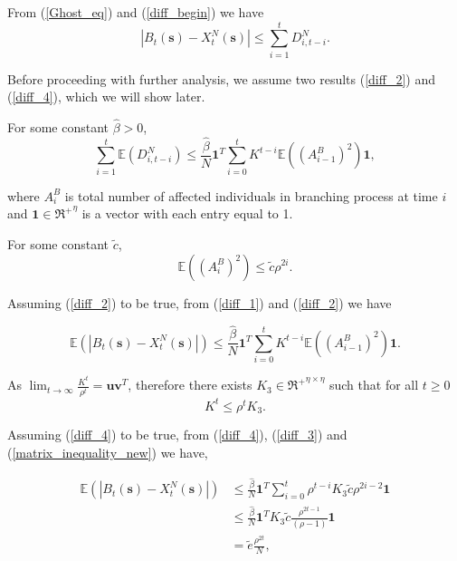 \documentclass{article}
\theoremstyle{definition}
\newcommand{\lrp}[1]{\left({#1}\right)}
\newcommand{\abs}[1]{\left\lvert{#1}\right\rvert}
\newcommand{\Exp}[1]{\mathbb{E}\lrp{#1}}
\begin{document}
From (\ref{Ghost_eq}) and (\ref{diff_begin}) we have
\begin{equation}
\abs{{{B}}_t(\bm{s}) - {{X}}^N_t(\bm{s})} \leq \sum_{i=1}^t D_{i,t-i}^N.
\label{diff_1}
\end{equation}

Before proceeding with further analysis, we assume two results (\ref{diff_2}) and (\ref{diff_4}), which we will show later. 

For some constant $\hat{\beta} > 0$,
 \begin{equation}\sum_{i=1}^t \Exp{D_{i,t-i}^N} \le \frac{\hat{\beta}}{N} \bm{1}^T \sum_{i=0}^{t} {K}^{t-i} \Exp{(A_{i-1}^B)^2 }\bm{1}, 
 \label{diff_2}
 \end{equation}
 
 where $A_i^B$ is total number of affected individuals in branching process at time $i$ and $\bm{1} \in {\Re^+}^{\eta}$ is a vector with each entry equal to 1. 
 
 For some constant $\tilde{c}$,
 \begin{equation}\Exp{\lrp{A^B_i}^2} \leq \tilde{c} \rho^{2i}. \label{diff_4}
 \end{equation}
 
Assuming (\ref{diff_2}) to be true, from (\ref{diff_1}) and (\ref{diff_2}) we have
 
 \begin{equation}\Exp{\abs{{{B}}_t(\bm{s}) - {{X}}^N_t(\bm{s})}} \le \frac{\hat{\beta}}{N} \bm{1}^T \sum_{i=0}^{t} {K}^{t-i} \Exp{(A_{i-1}^B)^2 } \bm{1}.
 \label{diff_3}
 \end{equation}

 As $\lim_{t \to \infty} \frac{K^t}{\rho^t} = \bm{{u}}\bm{v}^T$, therefore there exists $K_3 \in {\Re^+}^{\eta\times\eta}$ such that for all $ t\ge 0 $
 \begin{equation}K^t \le {\rho}^t  K_3.\label{matrix_inequality_new}
 \end{equation}
 
 Assuming (\ref{diff_4}) to be true, from (\ref{diff_4}), (\ref{diff_3}) and (\ref{matrix_inequality_new}) we have,

\begin{equation*} \label{eq:Bound1}
      \begin{aligned}
        \Exp{\abs{{{B}}_t(\bm{s}) - {{X}}^N_t(\bm{s})}}   &\le \frac{\hat{\beta}}{N} \bm{1}^T \sum_{i=0}^{t} \rho^{t-i} K_3 \tilde{c} \rho^{2i-2} \bm{1}\\
                                          &\le  \frac{\hat{\beta}}{N}  \bm{1}^T    K_3 \tilde{c} \frac{\rho^{2t-1}}{(\rho -1)}  \bm{1} \\
                                          &= \tilde{e} \frac{\rho^{2t}}{N} , 
      \end{aligned}
    \end{equation*}
   
\end{document}
